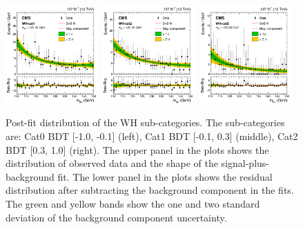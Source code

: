 \begin{figure}[!htb]
  \centering
  \captionsetup{justification=justified}
  \includegraphics[width=0.32\textwidth]{pics/VH_sec/VH_results/postfit_WH_cat1.png}
  \includegraphics[width=0.32\textwidth]{pics/VH_sec/VH_results/postfit_WH_cat2.png}
  \includegraphics[width=0.32\textwidth]{pics/VH_sec/VH_results/postfit_WH_cat3.png}
  \caption{Post-fit \mmm distribution of the WH sub-categories. The sub-categories are: Cat0 BDT [-1.0, -0.1] (left), Cat1 BDT [-0.1, 0.3] (middle), Cat2 BDT [0.3, 1.0] (right). 
           The upper panel in the plots shows the distribution of observed data and the shape of the signal-plus-background fit.
           The lower panel in the plots shows the residual distribution after subtracting the background component in the fits.
           The green and yellow bands show the one and two standard deviation of the background component uncertainty.}
  \label{fig:wh_postfit}
\end{figure}

